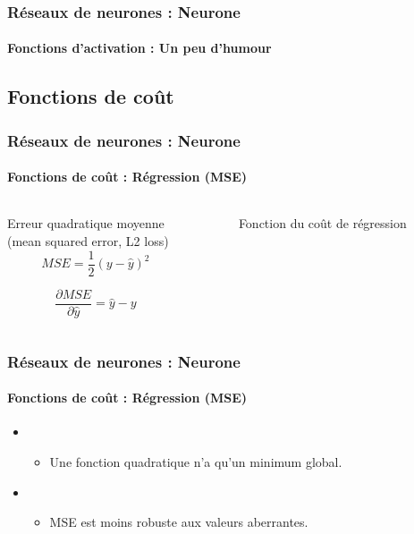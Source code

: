 \documentclass[xcolor=table]{beamer}
\begin{document}
\begin{frame}
	\frametitle{Réseaux de neurones : Neurone}
	\framesubtitle{Fonctions d'activation : Un peu d'humour}
	
	\begin{center}
	\end{center}
	
\end{frame}

\subsection{Fonctions de coût}

\begin{frame}
\frametitle{Réseaux de neurones : Neurone}
\framesubtitle{Fonctions de coût : Régression (MSE)}

\begin{columns}
	\begin{column}{.68\linewidth}
		\begin{block}{Erreur quadratique moyenne \\(mean squared error, L2 loss)}
			\[MSE = \frac{1}{2} (y - \hat{y})^2\]
			
			\[
			\frac{\partial MSE}{\partial \hat{y}} = \hat{y} - y
			\]
		\end{block}
		
	\end{column}%
	\begin{column}{.3\linewidth}
		\begin{figure}
			\caption{Fonction du coût de régression \cite{2017-rosenberg}}
		\end{figure}
	\end{column}
\end{columns}


\end{frame}

\begin{frame}
\frametitle{Réseaux de neurones : Neurone}
\framesubtitle{Fonctions de coût : Régression (MSE)}

\begin{itemize}
	\item {}
	\begin{itemize}
		\item Une fonction quadratique n'a qu'un minimum global.
	\end{itemize}
	\item {}
	\begin{itemize}
		\item MSE est moins robuste aux valeurs aberrantes.
	\end{itemize}
\end{itemize}

\end{frame}
\end{document}
